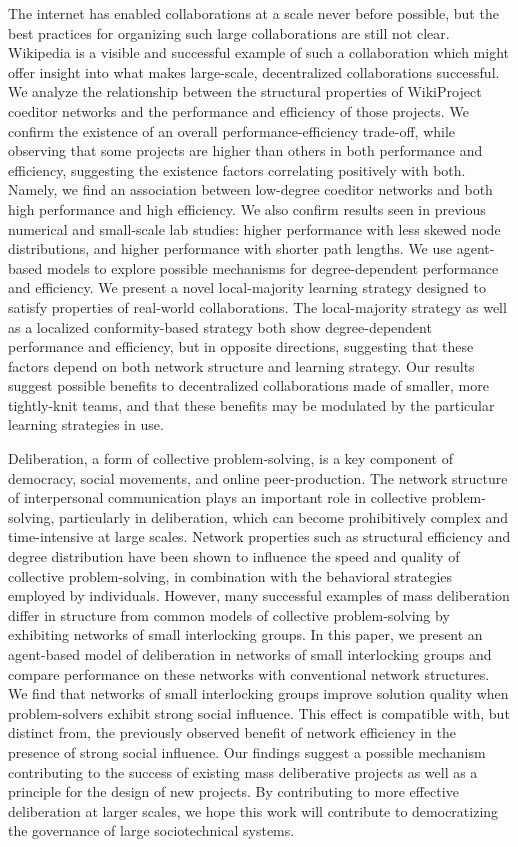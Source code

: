 The internet has enabled collaborations at a scale never before possible,
but the best practices for organizing such large collaborations are still not clear.
Wikipedia is a visible and successful example of such a collaboration which might offer
insight into what makes large-scale, decentralized collaborations successful.
We analyze the relationship between the structural properties of WikiProject coeditor networks
and the performance and efficiency of those projects.
We confirm the existence of an overall performance-efficiency trade-off,
while observing that some projects are higher than others in both performance
and efficiency,
suggesting the existence factors correlating positively with both.
Namely, we find an association between low-degree coeditor networks
and both high performance and high efficiency.
We also confirm results seen in previous numerical and small-scale lab studies:
higher performance with less skewed node distributions,
and higher performance with shorter path lengths.
We use agent-based models to explore possible mechanisms for
degree-dependent performance and efficiency.
We present a novel local-majority learning strategy designed to satisfy properties
of real-world collaborations.
The local-majority strategy as well as a localized conformity-based strategy
both show degree-dependent performance and efficiency,
but in opposite directions,
suggesting that these factors depend on both network structure and learning strategy.
Our results suggest 
possible benefits to decentralized collaborations made of smaller,
more tightly-knit teams,
and that these benefits may be modulated by the particular learning strategies
in use.

Deliberation, a form of collective problem-solving, is a key component of
democracy, social movements, and online peer-production.
The network structure of interpersonal communication plays an important role in
collective problem-solving, particularly in deliberation, which can become
prohibitively complex and time-intensive at large scales.
Network properties such as structural efficiency and degree distribution have
been shown to influence the speed and quality of collective problem-solving,
in combination with the behavioral strategies employed by individuals.
However, many successful examples of mass deliberation differ in structure from
common models of collective problem-solving by exhibiting networks of small
interlocking groups.
In this paper, we present an agent-based model of deliberation in networks of
small interlocking groups and compare performance on these networks with
conventional network structures.
We find that networks of small interlocking groups improve solution quality
when problem-solvers exhibit strong social influence.
This effect is compatible with, but distinct from, the previously observed
benefit of network efficiency in the presence of strong social influence.
Our findings suggest a possible mechanism contributing to the success of
existing mass deliberative projects as well as a principle for the design of
new projects.
By contributing to more effective deliberation at larger scales,
we hope this work will contribute to democratizing the governance of large
sociotechnical systems.
